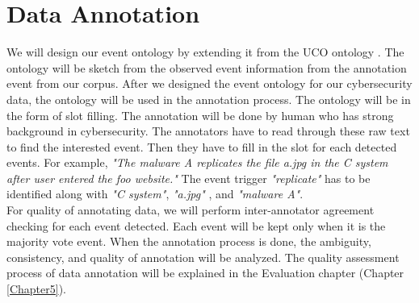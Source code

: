 \section{Data Annotation}
\label{dataannotation}
We will design our event ontology by extending it from the UCO ontology \cite{syed2016uco}. The ontology will be sketch from the observed event information from the annotation event from our corpus. After we designed the event ontology for our cybersecurity data, the ontology will be used in the annotation process. The ontology will be in the form of slot filling. The annotation will be done by human who has strong background in cybersecurity. The annotators have to read through these raw text to find the interested event. Then they have to fill in the slot for each detected events. For example, \textit{"The malware A replicates the file a.jpg in the C system after user entered the foo website."} The event trigger \textit{"replicate"} has to be identified along with \textit{"C system"}, \textit{"a.jpg"} , and \textit{"malware A"}. \\
\indent For quality of annotating data, we will perform inter-annotator agreement checking for each event detected. Each event will be kept only when it is the majority vote event. When the annotation process is done, the ambiguity, consistency, and quality of annotation will be analyzed. The quality assessment process of data annotation will be explained in the Evaluation chapter (Chapter \ref{Chapter5}).

